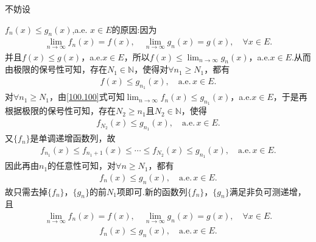 \documentclass[../../main.tex]{subfiles}
\begin{document}
\begin{remark}
\hypertarget{不妨设简单函数列保持不变的原因}{不妨设}$f_n(x)\leqslant g_n(x)$,a.e. $x\in E$的原因:因为
\begin{align}
\lim_{n\rightarrow \infty}f_n(x) = f(x),\quad \lim_{n\rightarrow \infty}g_n(x) = g(x),\quad \forall x\in E.\label{100.100}
\end{align}
并且$f(x) \leqslant g(x)$，a.e.$x\in E$，所以$f(x) \leqslant \lim_{n\rightarrow \infty}g_n(x)$，a.e.$x\in E$.从而由极限的保号性可知，存在$N_1\in \mathbb{N}$，使得对$\forall n_1\geqslant N_1$，都有
\begin{align*}
f(x) \leqslant g_{n_1}(x),\quad \text{a.e.}\,x\in E.
\end{align*}
对$\forall n_1\geqslant N_1$，由\eqref{100.100}式可知$\lim_{n\rightarrow \infty}f_n(x) \leqslant g_{n_1}(x)$，a.e.$x\in E$，于是再根据极限的保号性可知，存在$N_2\geqslant n_1$且$N_2\in \mathbb{N}$，使得
\begin{align*}
f_{N_2}(x) \leqslant g_{n_1}(x),\quad \text{a.e.}\,x\in E.
\end{align*}
又$\{ f_n \}$是单调递增函数列，故
\begin{align*}
f_{n_1}(x) \leqslant f_{n_1+1}(x) \leqslant \cdots \leqslant f_{N_2}(x) \leqslant g_{n_1}(x),\quad \text{a.e.}\,x\in E.
\end{align*}
因此再由$n_1$的任意性可知，对$\forall n\geqslant N_1$，都有
\begin{align*}
f_n(x) \leqslant g_n(x),\quad \text{a.e.}\,x\in E.
\end{align*}
故只需去掉$\{ f_n \}$，$\{ g_n \}$的前$N_1$项即可.新的函数列$\{ f_n \}$，$\{ g_n \}$满足非负可测递增，且
\begin{align*}
\lim_{n\rightarrow \infty}f_n(x) = f(x),\quad \lim_{n\rightarrow \infty}g_n(x) = g(x),\quad \forall x\in E.
\end{align*}
\begin{align*}
f_n(x) \leqslant g_n(x),\quad \text{a.e.}\,x\in E.
\end{align*}
\end{remark}
\end{document}
